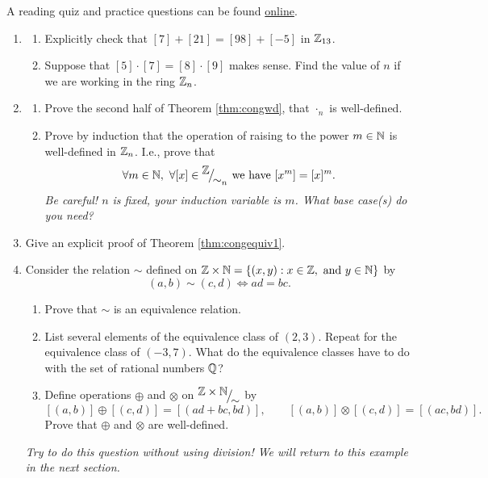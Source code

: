 \begin{exercises}{}{}
	A reading quiz and practice questions can be found \href{http://www.math.uci.edu/~ndonalds/math13/selftest/7-5-welldef.html}{online}.

\begin{enumerate}
  \item\begin{enumerate}
    \item Explicitly check that $[7]+[21]=[98]+[-5]$ in $\mathbb{Z}_{13}$.
    \item Suppose that $[5]\cdot[7]=[8]\cdot[9]$ makes sense. Find the value of $n$ if we are working in the ring $\mathbb{Z}_n$.
  \end{enumerate}
  
  \item\begin{enumerate}
    \item Prove the second half of Theorem \ref{thm:congwd}, that $\cdot_n$ is well-defined.
	  \item Prove by induction that the operation of raising to the power $m\in\mathbb{N}$ is well-defined in $\mathbb{Z}_n$. I.e., prove that
  \[\forall m\in\mathbb{N},\ \forall [x]\in{}^{\textstyle {\mathbb{Z}}}\!\big/_{\textstyle \!{\sim_n}}\text{ we have } [x^m]=[x]^m.\]
  \emph{Be careful! $n$ is fixed, your induction variable is $m$. What base case(s) do you need?}
  \end{enumerate} 
  
  \item Give an explicit proof of Theorem \ref{thm:congequiv1}.
  
  \item\label{ex:qequiv} Consider the relation $\sim$ defined on $\mathbb{Z}\times\mathbb{N}=\{(x,y):x\in\mathbb{Z},\text{ and }y\in\mathbb{N}\}$ by
  \[(a,b)\sim(c,d)\iff ad=bc.\]
  \begin{enumerate}
    \item Prove that $\sim$ is an equivalence relation.
    \item List several elements of the equivalence class of $(2,3)$. Repeat for the equivalence class of $(-3,7)$. What do the equivalence classes have to do with the set of rational numbers $\mathbb{Q}$?
    \item Define operations $\oplus$ and $\otimes$ on ${}^{\textstyle {\mathbb{Z}\times\mathbb{N}}}\!\big/_{\textstyle \!{\sim}}$ by
    \[[(a,b)]\oplus[(c,d)]=[(ad+bc,bd)],\qquad [(a,b)]\otimes[(c,d)]=[(ac,bd)].\]
    Prove that $\oplus$ and $\otimes$ are well-defined.
  \end{enumerate}
  \emph{Try to do this question \emph{without} using division! We will return to this example in the next section.}
\end{enumerate}

\end{exercises}
\clearpage



